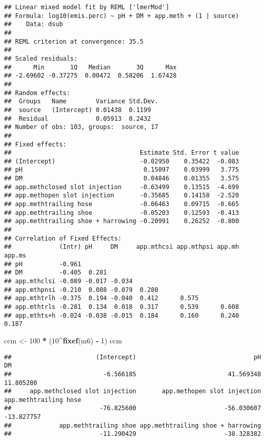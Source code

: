 \documentclass[
]{article}
\newenvironment{Shaded}{\begin{snugshade}}{\end{snugshade}}
\newcommand{\DecValTok}[1]{\textcolor[rgb]{0.00,0.00,0.81}{#1}}
\newcommand{\FunctionTok}[1]{\textcolor[rgb]{0.13,0.29,0.53}{\textbf{#1}}}
\newcommand{\NormalTok}[1]{#1}
\newcommand{\OtherTok}[1]{\textcolor[rgb]{0.56,0.35,0.01}{#1}}
\newcommand{\SpecialCharTok}[1]{\textcolor[rgb]{0.81,0.36,0.00}{\textbf{#1}}}
\begin{document}
\begin{verbatim}
## Linear mixed model fit by REML ['lmerMod']
## Formula: log10(emis.perc) ~ pH + DM + app.meth + (1 | source)
##    Data: dsub
## 
## REML criterion at convergence: 35.5
## 
## Scaled residuals: 
##      Min       1Q   Median       3Q      Max 
## -2.69602 -0.37275  0.00472  0.58206  1.67428 
## 
## Random effects:
##  Groups   Name        Variance Std.Dev.
##  source   (Intercept) 0.01438  0.1199  
##  Residual             0.05913  0.2432  
## Number of obs: 103, groups:  source, 17
## 
## Fixed effects:
##                                   Estimate Std. Error t value
## (Intercept)                       -0.02950    0.35422  -0.083
## pH                                 0.15097    0.03999   3.775
## DM                                 0.04846    0.01355   3.575
## app.methclosed slot injection     -0.63499    0.13515  -4.699
## app.methopen slot injection       -0.35685    0.14158  -2.520
## app.methtrailing hose             -0.06463    0.09715  -0.665
## app.methtrailing shoe             -0.05203    0.12593  -0.413
## app.methtrailing shoe + harrowing -0.20991    0.26252  -0.800
## 
## Correlation of Fixed Effects:
##             (Intr) pH     DM     app.mthcsi app.mthpsi app.mh app.ms
## pH          -0.961                                                  
## DM          -0.405  0.281                                           
## app.mthclsi -0.089 -0.017 -0.034                                    
## app.mthpnsi -0.210  0.088 -0.079  0.280                             
## app.mthtrlh -0.375  0.194 -0.040  0.412      0.575                  
## app.mthtrls -0.281  0.134  0.018  0.317      0.539      0.608       
## app.mthts+h -0.024 -0.038 -0.015  0.184      0.160      0.240  0.187
\end{verbatim}

\begin{Shaded}
\begin{Highlighting}[]
\NormalTok{ccm }\OtherTok{\textless{}{-}} \DecValTok{100} \SpecialCharTok{*}\NormalTok{ (}\DecValTok{10}\SpecialCharTok{\^{}}\FunctionTok{fixef}\NormalTok{(m6) }\SpecialCharTok{{-}} \DecValTok{1}\NormalTok{)}
\NormalTok{ccm}
\end{Highlighting}
\end{Shaded}

\begin{verbatim}
##                       (Intercept)                                pH                                DM 
##                         -6.566185                         41.569348                         11.805280 
##     app.methclosed slot injection       app.methopen slot injection             app.methtrailing hose 
##                        -76.825600                        -56.030607                        -13.827757 
##             app.methtrailing shoe app.methtrailing shoe + harrowing 
##                        -11.290429                        -38.328382
\end{verbatim}
\end{document}
